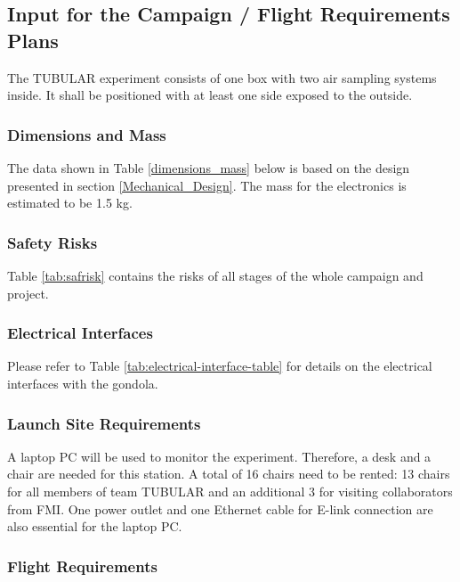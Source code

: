 \subsection{Input for the Campaign / Flight Requirements Plans}

The TUBULAR experiment consists of one box with two air sampling systems inside. It shall be positioned with at least one side exposed to the outside.

\subsubsection{Dimensions and Mass}

The data shown in Table \ref{dimensions_mass} below is based on the design presented in section \ref{Mechanical_Design}.  The mass for the electronics is estimated to be 1.5 kg.  



\subsubsection{Safety Risks}
Table \ref{tab:safrisk} contains the risks of all stages of the whole campaign and project.


\pagebreak
\subsubsection{Electrical Interfaces}

Please refer to Table \ref{tab:electrical-interface-table} for details on the electrical interfaces with the gondola.



\subsubsection{Launch Site Requirements}
A laptop PC will be used to monitor the experiment. Therefore, a desk and a chair are needed for this station. A total of 16 chairs need to be rented: 13 chairs for all members of team TUBULAR and an additional 3 for visiting collaborators from FMI. One power outlet and one Ethernet cable for E-link connection are also essential for the laptop PC.

\subsubsection{Flight Requirements}


